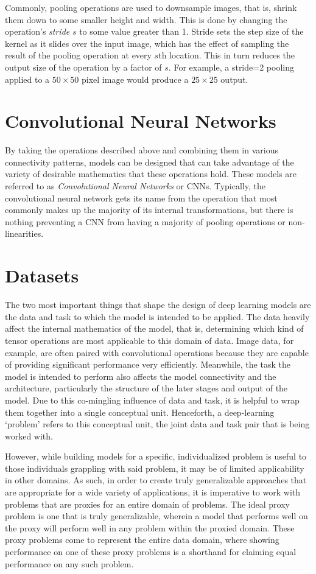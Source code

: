 Commonly, pooling operations are used to downsample images, that is, shrink them down to some smaller height and width.
This is done by changing the operation's \textit{stride} $s$ to some value greater than 1. Stride sets the step size of the kernel as it slides
over the input image, which has the effect of sampling the result of the pooling operation at every $s$th
location. This in turn reduces the output size of the operation by a factor of $s$. For example, a stride=2 pooling applied to a
$50 \times 50$ pixel image would produce a $25 \times 25$ output.

\section{Convolutional Neural Networks} \label{sect:nn_advanced_end}
By taking the operations described above and combining them in various connectivity patterns, models can be designed that
can take advantage of the variety of desirable mathematics that these operations hold. These models are
referred to as \textit{Convolutional Neural Networks} or CNNs. Typically, the convolutional neural network gets its name
from the operation that most commonly makes up the majority of its internal transformations, but there is nothing preventing
a CNN from having a majority of pooling operations or non-linearities.

\section{Datasets} \label{sect:data_policies}
The two most important things that shape the design of deep learning models are the data and task to which the model is intended
to be applied. The data heavily affect the internal mathematics of the model, that is, determining which kind of tensor
operations are most applicable to this domain of data. Image data, for example, are often paired with
convolutional operations because they are capable of providing significant performance very efficiently. Meanwhile,
the task the model is intended to perform also affects the model connectivity and the architecture, particularly the structure
of the later stages and output of the model. Due to this co-mingling influence of data and task, it is helpful to wrap them
together into a single conceptual unit. Henceforth, a deep-learning `problem' refers to this conceptual unit, the joint data
and task pair that is being worked with.

However, while building models for a specific, individualized problem is useful to those individuals grappling with said problem,
it may be of limited applicability in other domains. As such, in order to create truly generalizable approaches that are
appropriate for a wide variety of applications, it is imperative to work with problems that are proxies for an entire domain of problems.
The ideal proxy problem is one that is truly generalizable, wherein a model that performs well on the proxy will
perform well in any problem within the proxied domain. These proxy problems come to represent the entire data domain,
where showing performance on one of these proxy problems is a shorthand for claiming equal performance on any such problem.

